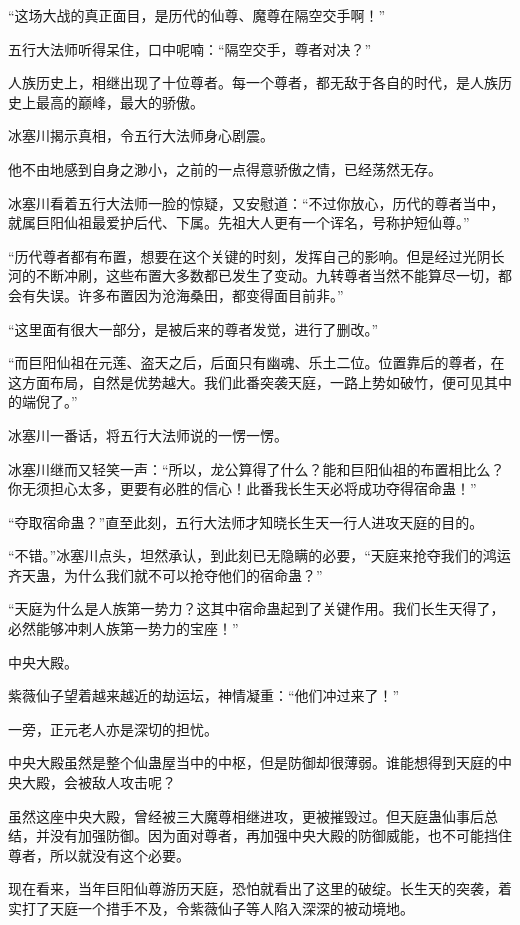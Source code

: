 \begin{this_body}
“这场大战的真正面目，是历代的仙尊、魔尊在隔空交手啊！”

五行大法师听得呆住，口中呢喃：“隔空交手，尊者对决？”

人族历史上，相继出现了十位尊者。每一个尊者，都无敌于各自的时代，是人族历史上最高的巅峰，最大的骄傲。

冰塞川揭示真相，令五行大法师身心剧震。

他不由地感到自身之渺小，之前的一点得意骄傲之情，已经荡然无存。

冰塞川看着五行大法师一脸的惊疑，又安慰道：“不过你放心，历代的尊者当中，就属巨阳仙祖最爱护后代、下属。先祖大人更有一个诨名，号称护短仙尊。”

“历代尊者都有布置，想要在这个关键的时刻，发挥自己的影响。但是经过光阴长河的不断冲刷，这些布置大多数都已发生了变动。九转尊者当然不能算尽一切，都会有失误。许多布置因为沧海桑田，都变得面目前非。”

“这里面有很大一部分，是被后来的尊者发觉，进行了删改。”

“而巨阳仙祖在元莲、盗天之后，后面只有幽魂、乐土二位。位置靠后的尊者，在这方面布局，自然是优势越大。我们此番突袭天庭，一路上势如破竹，便可见其中的端倪了。”

冰塞川一番话，将五行大法师说的一愣一愣。

冰塞川继而又轻笑一声：“所以，龙公算得了什么？能和巨阳仙祖的布置相比么？你无须担心太多，更要有必胜的信心！此番我长生天必将成功夺得宿命蛊！”

“夺取宿命蛊？”直至此刻，五行大法师才知晓长生天一行人进攻天庭的目的。

“不错。”冰塞川点头，坦然承认，到此刻已无隐瞒的必要，“天庭来抢夺我们的鸿运齐天蛊，为什么我们就不可以抢夺他们的宿命蛊？”

“天庭为什么是人族第一势力？这其中宿命蛊起到了关键作用。我们长生天得了，必然能够冲刺人族第一势力的宝座！”

中央大殿。

紫薇仙子望着越来越近的劫运坛，神情凝重：“他们冲过来了！”

一旁，正元老人亦是深切的担忧。

中央大殿虽然是整个仙蛊屋当中的中枢，但是防御却很薄弱。谁能想得到天庭的中央大殿，会被敌人攻击呢？

虽然这座中央大殿，曾经被三大魔尊相继进攻，更被摧毁过。但天庭蛊仙事后总结，并没有加强防御。因为面对尊者，再加强中央大殿的防御威能，也不可能挡住尊者，所以就没有这个必要。

现在看来，当年巨阳仙尊游历天庭，恐怕就看出了这里的破绽。长生天的突袭，着实打了天庭一个措手不及，令紫薇仙子等人陷入深深的被动境地。


\end{this_body}

